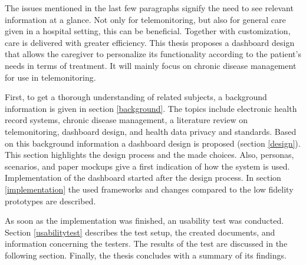 The issues mentioned in the last few paragraphs signify the need to see relevant information at a glance. Not only for telemonitoring, but also for general care given in a hospital setting, this can be beneficial. Together with customization, care is delivered with greater efficiency. This thesis proposes a dashboard design that allows the caregiver to personalize its functionality according to the patient's needs in terms of treatment. It will mainly focus on chronic disease management for use in telemonitoring.

First, to get a thorough understanding of related subjects, a background information is given in section \ref{background}. The topics include electronic health record systems, chronic disease management, a literature review on telemonitoring, dashboard design, and health data privacy and standards. Based on this background information a dashboard design is proposed (section \ref{design}). This section highlights the design process and the made choices. Also, personas, scenarios, and paper mockups give a first indication of how the system is used. Implementation of the dashboard started after the design process. In section \ref{implementation} the used frameworks and changes compared to the low fidelity prototypes are described.

As soon as the implementation was finished, an usability test was conducted. Section \ref{usabilitytest} describes the test setup, the created documents, and information concerning the testers. The results of the test are discussed in the following section. Finally, the thesis concludes with a summary of its findings. 